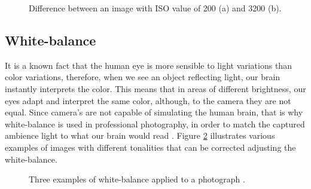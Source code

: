 \begin{figure}[htbp]
        \centering
  \caption{Difference between an image with ISO value of 200 (a) and 3200 (b).}
  \label{fig:iso_example}
\end{figure}

\subsection{White-balance}
\label{sub:white_balance}

It is a known fact that the human eye is more sensible to light variations than color variations, therefore, when we see an object reflecting light, our brain instantly interprets the color. This means that in areas of different brightness, our eyes adapt and interpret the same color, although, to the camera they are not equal.
Since camera's are not capable of simulating the human brain, that is why white-balance is used in professional photography, in order to match the captured ambience light to what our brain would read \cite{Kamps2012}. Figure \ref{fig:white_balance_example} illustrates various examples of images with different tonalities that can be corrected adjusting the white-balance.

\begin{figure}[htbp]
        \centering
  \caption{Three examples of white-balance applied to a photograph \cite{Kamps2012}.}
  \label{fig:white_balance_example}
\end{figure}





